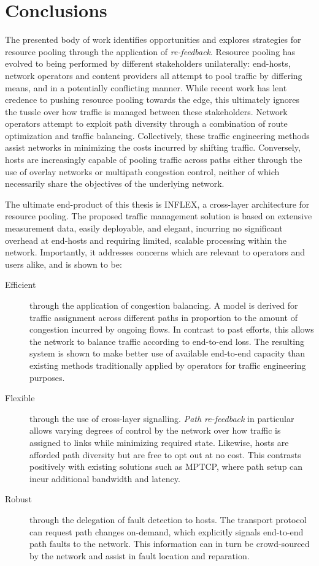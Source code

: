 \chapter{Conclusions}
\label{chapter:conclusions}

The presented body of work identifies opportunities and explores strategies for resource pooling through the application of \emph{re-feedback}.
Resource pooling has evolved to being performed by different stakeholders unilaterally: end-hosts, network operators and content providers all attempt to pool traffic by differing means, and in a potentially conflicting manner.
While recent work has lent credence to pushing resource pooling towards the edge, this ultimately ignores the tussle over how traffic is managed between these stakeholders.
Network operators attempt to exploit path diversity through a combination of route optimization and traffic balancing.
Collectively, these traffic engineering methods assist networks in minimizing the costs incurred by shifting traffic.
Conversely, hosts are increasingly capable of pooling traffic across paths either through the use of overlay networks or multipath congestion control, neither of which necessarily share the objectives of the underlying network.

The ultimate end-product of this thesis is INFLEX, a cross-layer architecture for resource pooling.
The proposed traffic management solution is based on extensive measurement data, easily deployable, and elegant, incurring no significant overhead at end-hosts and requiring limited, scalable processing within the network.
Importantly, it addresses concerns which are relevant to operators and users alike, and is shown to be:

\renewcommand{\descriptionlabel}[1]{\hspace{\labelsep}\textbf{#1}}
\begin{description}
\item[Efficient] through the application of congestion balancing. A model is derived for traffic assignment across different paths in proportion to the amount of congestion incurred by ongoing flows. In contrast to past efforts, this allows the network to balance traffic according to end-to-end loss. The resulting system is shown to make better use of available end-to-end capacity than existing methods traditionally applied by operators for traffic engineering purposes.
\item[Flexible] through the use of cross-layer signalling. \emph{Path re-feedback} in particular allows varying degrees of control by the network over how traffic is assigned to links while minimizing required state. Likewise, hosts are afforded path diversity but are free to opt out at no cost. This contrasts positively with existing solutions such as \ac{MPTCP}, where path setup can incur additional bandwidth and latency.
\item[Robust] through the delegation of fault detection to hosts. The transport protocol can request path changes on-demand, which explicitly signals end-to-end path faults to the network. This information can in turn be crowd-sourced by the network and assist in fault location and reparation.
\end{description}



